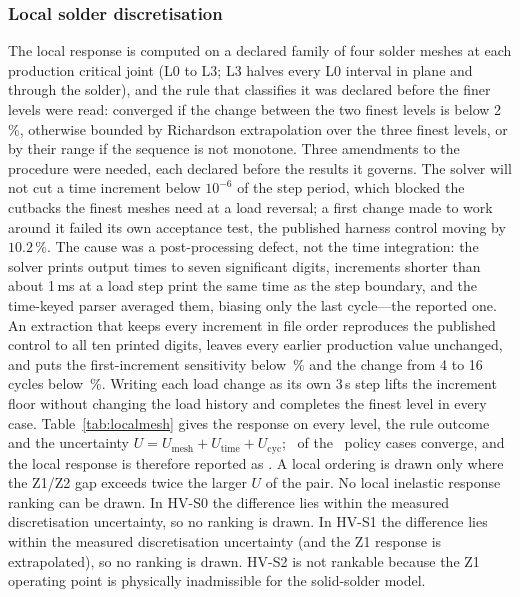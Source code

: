 \documentclass[journal]{IEEEtran}
\begin{document}
\subsubsection{Local solder discretisation}\label{sec:localmesh}
The local response is computed on a declared family of four solder meshes at each production
critical joint (L0 to L3; L3 halves every L0 interval in plane and through the solder), and the
rule that classifies it was declared before the finer levels were read: converged if the change
between the two finest levels is below 2\,\%, otherwise bounded by Richardson extrapolation
over the three finest levels, or by their range if the sequence is not monotone. Three
amendments to the procedure were needed, each declared before the results it governs. The
solver will not cut a time increment below $10^{-6}$ of the step period, which blocked the
cutbacks the finest meshes need at a load reversal; a first change made to work around it failed
its own acceptance test, the published harness control moving by $10.2\,\%$. The cause was a
post-processing defect, not the time integration: the solver prints output times to seven
significant digits, increments shorter than about 1\,ms at a load step print the same time as
the step boundary, and the time-keyed parser averaged them, biasing only the last cycle---the
reported one. An extraction that keeps every increment in file order reproduces the published
control to all ten printed digits, leaves every earlier production value unchanged, and puts
the first-increment sensitivity below \UtimeMax\,\% and the change from 4 to 16 cycles below
\UcycMax\,\%. Writing each load change as its own 3\,s step lifts the increment floor
without changing the load history and completes the finest level in every case.
Table~\ref{tab:localmesh} gives the response on every level, the rule outcome and the
uncertainty $U = U_{\mathrm{mesh}} + U_{\mathrm{time}} + U_{\mathrm{cyc}}$; \LocalNconverged\
of the \LocalNcases\ policy cases converge, and the local response is therefore reported as
\LocalMeshPhrase. A local ordering is drawn only where the Z1/Z2 gap exceeds twice the larger
$U$ of the pair. No local inelastic response ranking can be drawn. In HV-S0 the difference lies within the measured discretisation uncertainty, so no ranking is drawn. In HV-S1 the difference lies within the measured discretisation uncertainty (and the Z1 response is extrapolated), so no ranking is drawn. HV-S2 is not rankable because the Z1 operating point is physically inadmissible for the solid-solder model.

\end{document}
